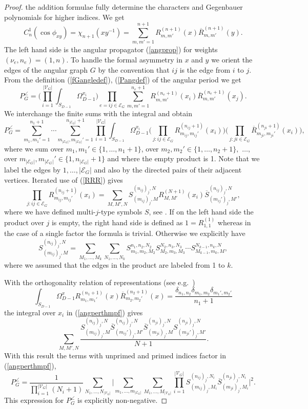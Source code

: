 \documentclass[oneside]{amsart}
\newcommand{\sE}{\mathcal{E}}
\newcommand{\sV}{\mathcal{V}}
\theoremstyle{plain}
\begin{document}
\begin{proof}
the addition formulae fully determine the characters and Gegenbauer polynomials for higher indices. We get
$$
C^1_n(\cos\phi_{xy})=\chi_{n+1}(xy^{-1})=\sum_{m,m'=1}^{n+1}R^{(n+1)}_{m,m'}(x)\overline R^{(n+1)}_{m,m'}(y).
$$
The left hand side is the angular propagator (\ref{angprop}) for weights $(\nu_e,n_e)=(1,n)$. To handle the formal asymmetry in $x$ and $y$ we orient the edges of the angular graph
$G$ by the convention that $ij$ is the edge from $i$ to $j$. From the definition (\ref{fGangledef}), (\ref{Pangdef}) of the angular period we get
$$
P_G^\angle=\Big(\prod_{i=1}^{|\sV_G|}\int_{S_{D-1}}\Omega^{x_i}_{D-1}\Big)\prod_{e=ij\in\sE_G}\sum_{m,m'=1}^{n_e+1}R^{(n_e+1)}_{m,m'}(x_i)\overline R^{(n_e+1)}_{m,m'}(x_j).
$$
We interchange the finite sums with the integral and obtain
\begin{equation}\label{angperthmpf}
P_G^\angle=\sum_{m_1,m_1'=1}^{n_1+1}\cdots\sum_{m_{|\sE_G|},m_{|\sE_G|}'=1}^{n_{|\sE_G|}+1}\prod_{i=1}^{|\sV_G|}\int_{S_{D-1}}\Omega^{x_i}_{D-1}
\Big(\prod_{j:ij\in\sE_G}R^{(n_{ij}+1)}_{m_{ij},m_{ij}'}(x_i)\Big)\Big(\prod_{j:ji\in\sE_G}\overline R^{(n_{ji}+1)}_{m_{ji},m_{ji}'}(x_i)\Big),
\end{equation}
where we sum over $m_1,m_1' \in \{1,\ldots,n_1+1\}$, over $m_2,m_2' \in \{1,\ldots,n_2+1\},$
$\ldots,$
over 
$m_{|\sE_G|},m_{|\sE_G|}' \in \{ 1, n_{|\sE_G|}+1\}$ and 
where the empty product is 1. Note that we label the edges by $1,\ldots,|\sE_G|$ and also by the directed pairs of their adjacent vertices.
Iterated use of (\ref{RRR}) gives
$$
\prod_{j:ij\in\sE_G}R^{(n_{ij}+1)}_{m_{ij},m_{ij}'}(x_i)=\sum_{M,M',N}S^{(n_{ij})_j,N}_{(m_{ij})_j,M}R^{(N+1)}_{M,M'}(x_i)\overline S^{(n_{ij})_j,N}_{(m_{ij}')_j,M'},
$$
where we have defined multi-$j$-type symbols $S$, see \cite{Smultij}.
If on the left hand side the product over $j$ is empty, the right hand side is defined as $1=R^{(1)}_{1,1}$ whereas in the case of a single factor the formula is trivial.
Otherwise we explicitly have
$$
S^{(n_{ij})_j,N}_{(m_{ij})_j,M}=\sum_{M_1,\ldots,M_k}\sum_{N_1,\ldots,N_k}S^{n_1,n_2,N_2}_{m_1,m_2,M_2}S^{N_2,n_3,N_3}_{M_2,m_3,M_3}\cdots S^{N_{k-1},n_k,N}_{M_{k-1},m_k,M},
$$
where we assumed that the edges in the product are labeled from 1 to $k$.

With the orthogonality relation of representations (see e.g.\ \cite{DStanton})
$$
\int_{S_{D-1}}\Omega^x_{D-1}R^{(n_1+1)}_{m_1,m_1'}(x)\overline R^{(n_2+1)}_{m_2,m_2'}(x)=\frac{\delta_{n_1,n_2}\delta_{m_1,m_2}\delta_{m_1',m_2'}}{n_1+1}
$$
the integral over $x_i$ in (\ref{angperthmpf}) gives
$$
\sum_{M,M',N}\frac{S^{(n_{ij})_j,N}_{(m_{ij})_j,M}\overline S^{(n_{ij})_j,N}_{(m_{ij}')_j,M'}\overline S^{(n_{ji})_j,N}_{(m_{ji})_j,M}S^{(n_{ji})_j,N}_{(m_{ji}')_j,M'}}{N+1}.
$$
With this result the terms with unprimed and primed indices factor in (\ref{angperthmpf}),
$$
P_G^\angle=\frac{1}{\prod_{i=1}^{|\sV_G|}(N_i+1)}\sum_{N_1,\ldots,N_{|\sV_G|}}\Big|\sum_{m_1,\ldots,m_{|\sE_G|}}\sum_{M_1,\ldots,M_{|\sV_G|}}\prod_{i=1}^{|\sV_G|}
S^{(n_{ij})_j,N_i}_{(m_{ij})_j,M_i}\overline S^{(n_{ji})_j,N_i}_{(m_{ji})_j,M_i}\Big|^2.
$$
This expression for $P_G^\angle$ is explicitly non-negative.
\end{proof}
\end{document}
